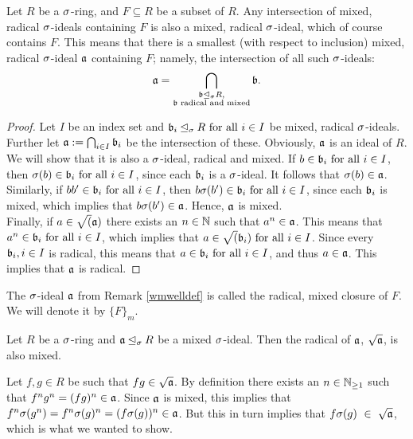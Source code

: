 \begin{rem}\label{wmwelldef}
Let $R$ be a $\sigma$-ring, and $F \subseteq R$ be a subset of $R$. Any intersection of mixed, radical $\sigma$-ideals containing $F$ is also a mixed, radical $\sigma$-ideal, which of course contains $F$. 
This means that there is a smallest (with respect to inclusion) mixed, radical $\sigma$-ideal $\mathfrak{a}$ containing $F$; namely, the intersection of all such $\sigma$-ideals:
\begin{align*} \mathfrak{a} = \bigcap_{\substack{ \mathfrak{b} \unlhd_{\sigma} R, \\ \mathfrak{b} \text{ radical and mixed}}} \mathfrak{b}. \end{align*}
\begin{proof}
Let $I$ be an index set and $\mathfrak{b}_i \unlhd_{\sigma} R \text{ for all } i \in I$ be mixed, radical $\sigma$-ideals. Further let $\mathfrak{a} := \bigcap_{i \in I} \mathfrak{b}_i$ be the intersection of these. Obviously, $\mathfrak{a}$ is an ideal of $R$. We will show that it is also a $\sigma$-ideal, radical and mixed.
If $b \in \mathfrak{b}_i \text{ for all } i \in I$, then $\sigma(b) \in \mathfrak{b}_i \text{ for all } i \in I$, since each $\mathfrak{b}_i$ is a $\sigma$-ideal.
It follows that $\sigma(b) \in \mathfrak{a}$. \\
\indent Similarly, if $bb' \in \mathfrak{b}_i \text{ for all } i \in I$, then $b \sigma(b') \in \mathfrak{b}_i \text{ for all } i \in I$, since each $\mathfrak{b}_i$ is mixed, which implies that $b \sigma(b') \in \mathfrak{a}$. Hence, $\mathfrak{a}$ is mixed.  \\
\indent Finally, if $a \in \sqrt(\mathfrak{a})$ there exists an $n \in \mathbb{N}$ such that $a^n \in \mathfrak{a}$. This means that $a^n \in \mathfrak{b}_i \text{ for all } i \in I$, which implies that $a \in \sqrt(\mathfrak{b}_i) \text{ for all } i \in I$. Since every $\mathfrak{b}_i, i \in I$ is radical, this means that $a \in \mathfrak{b}_i \text{ for all } i \in I$,
and thus $a \in \mathfrak{a}$. This implies that $\mathfrak{a}$ is radical.
\end{proof}
\end{rem}

\begin{defn}
The $\sigma$-ideal $\mathfrak{a}$ from Remark \ref{wmwelldef} is called the radical, mixed closure of $F$. We will denote it by $\{F\}_{m}$.
\end{defn}


\begin{lem}\label{sqrtmixed}
Let $R$ be a $\sigma$-ring and $\mathfrak{a} \unlhd_{\sigma} R$ be a mixed $\sigma$-ideal. Then the radical of $\mathfrak{a}$, $\sqrt{\mathfrak{a}}$, is also mixed.
\begin{bew}
Let $f,g \in R$ be such that $fg \in \sqrt {\mathfrak{a}}$. By definition there exists an $n \in \mathbb{N}_{\geq1}$ such that $f^n g^n = (fg)^n \in \mathfrak{a}$. Since $\mathfrak{a}$ is mixed, this implies that $f^n \sigma(g^n) = f^n \sigma(g)^n = (f\sigma(g))^n \in \mathfrak{a}$. 
But this in turn implies that $f\sigma(g)~\in~\sqrt {\mathfrak{a}}$, which is what we wanted to show.
\end{bew}
\end{lem}


